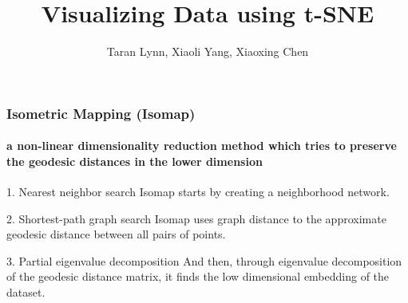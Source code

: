 \documentclass{beamer}
\title{Visualizing Data using t-SNE}
\author{Taran Lynn, Xiaoli Yang, Xiaoxing Chen}
\begin{document}
\maketitle

% 
% 
% 
% 
\begin{frame}
  \frametitle{Isometric Mapping (Isomap)}
  \framesubtitle{a non-linear dimensionality reduction method which tries to preserve the geodesic distances in the lower dimension}

  \begin{block}{1. Nearest neighbor search}
    Isomap starts by creating a neighborhood network.
  \end{block}

  \begin{block}{2. Shortest-path graph search}
    Isomap uses graph distance to the approximate geodesic distance between all pairs of points.
  \end{block}

  \begin{block}{3. Partial eigenvalue decomposition}
    And then, through eigenvalue decomposition of the geodesic distance matrix, it finds the low dimensional embedding of the dataset.
  \end{block}
  

\end{frame}
\end{document}
